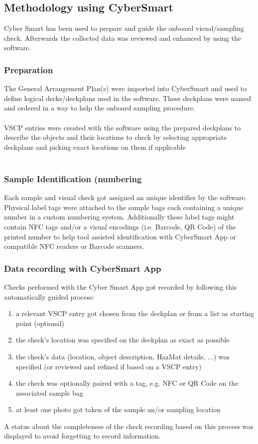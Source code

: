 \documentclass{article}
\begin{document}
\subsection{Methodology using CyberSmart}
Cyber Smart has been used to prepare and guide the onboard visual/sampling
check. Afterwards the collected data was reviewed and enhanced by using the
software.

\subsubsection{Preparation}

The General Arrangement Plan(s) were imported into CyberSmart and used to
define logical decks/deckplans used in the software. These deckplans were
named and ordered in a way to help the onboard sampling procedure. \\ \\
VSCP entries were created with the software using the prepared deckplans to
describe the objects and their locations to check by selecting appropriate
deckplans and picking exact locations on them if applicable \\ \\

\subsubsection{Sample Identification (numbering}
Each sample and visual check got assigned an unique identifier by the software.
Physical label tags were attached to the sample bags each containing a unique
number in a custom numbering system. Additionally these label tags might
contain NFC tags and/or a visual encodings (i.e. Barcode, QR Code) of the
printed number to help tool assisted identification with CyberSmart App or
compatible NFC readers or Barcode scanners.

\subsubsection{Data recording with CyberSmart App}
Checks performed with the Cyber Smart App got recorded by following this
automatically guided process:

\begin{enumerate}
    \item a relevant VSCP entry got chosen from the deckplan or from a list as
starting point (optional)
\item the check's location was specified on the deckplan as exact as possible
\item the check's data (location, object description, HazMat details, ...) was
specified (or reviewed and refined if based on a VSCP entry)
\item the check was optionally paired with a tag, e.g. NFC or QR Code on the
associated sample bag
\item at least one photo got taken of the sample an/or sampling location
\end{enumerate}
A status about the completeness of the check recording based on this process
was displayed to avoid forgetting to record information.
\end{document}
